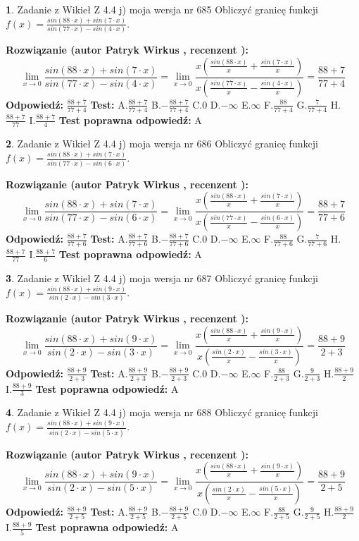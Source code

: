 \documentclass[12pt, a4paper]{article}
\theoremstyle{definition} %
\newtheorem{zad}{}
\newcommand{\zadStart}[1]{\begin{zad}#1\newline}
\newcommand{\zadStop}{\end{zad}}
\newcommand{\rozwStart}[2]{\noindent \textbf{Rozwiązanie (autor #1 , recenzent #2): }\newline}
\newcommand{\rozwStop}{\newline}
\newcommand{\odpStart}{\noindent \textbf{Odpowiedź:}\newline}
\newcommand{\odpStop}{\newline}
\newcommand{\testStart}{\noindent \textbf{Test:}\newline}
\newcommand{\testStop}{\newline}
\newcommand{\kluczStart}{\noindent \textbf{Test poprawna odpowiedź:}\newline}
\newcommand{\kluczStop}{\newline}
\begin{document}
\zadStart{Zadanie z Wikieł Z 4.4 j) moja wersja nr 685}
Obliczyć granicę funkcji $f(x)=\frac{sin(88\cdot x) +sin(7\cdot x)}{sin(77\cdot x) -sin(4\cdot x)}$.
\zadStop
\rozwStart{Patryk Wirkus}{}
$$\lim\limits_{x\to 0}\frac{sin(88\cdot x) +sin(7\cdot x)}{sin(77\cdot x) -sin(4\cdot x)}=\lim\limits_{x\to 0}\frac{x(\frac{sin(88\cdot x)}{x}+\frac{sin(7\cdot x)}{x})}{x(\frac{sin(77\cdot x)}{x}-\frac{sin(4\cdot x)}{x})}=\frac{88+7}{77+4}$$
\rozwStop
\odpStart
$\frac{88+7}{77+4}$
\odpStop
\testStart
A.$\frac{88+7}{77+4}$
B.$-\frac{88+7}{77+4}$
C.$0$
D.$-\infty$
E.$\infty$
F.$\frac{88}{77+4}$
G.$\frac{7}{77+4}$
H.$\frac{88+7}{77}$
I.$\frac{88+7}{4}$
\testStop
\kluczStart
A
\kluczStop



\zadStart{Zadanie z Wikieł Z 4.4 j) moja wersja nr 686}
Obliczyć granicę funkcji $f(x)=\frac{sin(88\cdot x) +sin(7\cdot x)}{sin(77\cdot x) -sin(6\cdot x)}$.
\zadStop
\rozwStart{Patryk Wirkus}{}
$$\lim\limits_{x\to 0}\frac{sin(88\cdot x) +sin(7\cdot x)}{sin(77\cdot x) -sin(6\cdot x)}=\lim\limits_{x\to 0}\frac{x(\frac{sin(88\cdot x)}{x}+\frac{sin(7\cdot x)}{x})}{x(\frac{sin(77\cdot x)}{x}-\frac{sin(6\cdot x)}{x})}=\frac{88+7}{77+6}$$
\rozwStop
\odpStart
$\frac{88+7}{77+6}$
\odpStop
\testStart
A.$\frac{88+7}{77+6}$
B.$-\frac{88+7}{77+6}$
C.$0$
D.$-\infty$
E.$\infty$
F.$\frac{88}{77+6}$
G.$\frac{7}{77+6}$
H.$\frac{88+7}{77}$
I.$\frac{88+7}{6}$
\testStop
\kluczStart
A
\kluczStop



\zadStart{Zadanie z Wikieł Z 4.4 j) moja wersja nr 687}
Obliczyć granicę funkcji $f(x)=\frac{sin(88\cdot x) +sin(9\cdot x)}{sin(2\cdot x) -sin(3\cdot x)}$.
\zadStop
\rozwStart{Patryk Wirkus}{}
$$\lim\limits_{x\to 0}\frac{sin(88\cdot x) +sin(9\cdot x)}{sin(2\cdot x) -sin(3\cdot x)}=\lim\limits_{x\to 0}\frac{x(\frac{sin(88\cdot x)}{x}+\frac{sin(9\cdot x)}{x})}{x(\frac{sin(2\cdot x)}{x}-\frac{sin(3\cdot x)}{x})}=\frac{88+9}{2+3}$$
\rozwStop
\odpStart
$\frac{88+9}{2+3}$
\odpStop
\testStart
A.$\frac{88+9}{2+3}$
B.$-\frac{88+9}{2+3}$
C.$0$
D.$-\infty$
E.$\infty$
F.$\frac{88}{2+3}$
G.$\frac{9}{2+3}$
H.$\frac{88+9}{2}$
I.$\frac{88+9}{3}$
\testStop
\kluczStart
A
\kluczStop



\zadStart{Zadanie z Wikieł Z 4.4 j) moja wersja nr 688}
Obliczyć granicę funkcji $f(x)=\frac{sin(88\cdot x) +sin(9\cdot x)}{sin(2\cdot x) -sin(5\cdot x)}$.
\zadStop
\rozwStart{Patryk Wirkus}{}
$$\lim\limits_{x\to 0}\frac{sin(88\cdot x) +sin(9\cdot x)}{sin(2\cdot x) -sin(5\cdot x)}=\lim\limits_{x\to 0}\frac{x(\frac{sin(88\cdot x)}{x}+\frac{sin(9\cdot x)}{x})}{x(\frac{sin(2\cdot x)}{x}-\frac{sin(5\cdot x)}{x})}=\frac{88+9}{2+5}$$
\rozwStop
\odpStart
$\frac{88+9}{2+5}$
\odpStop
\testStart
A.$\frac{88+9}{2+5}$
B.$-\frac{88+9}{2+5}$
C.$0$
D.$-\infty$
E.$\infty$
F.$\frac{88}{2+5}$
G.$\frac{9}{2+5}$
H.$\frac{88+9}{2}$
I.$\frac{88+9}{5}$
\testStop
\kluczStart
A
\kluczStop
\end{document}
